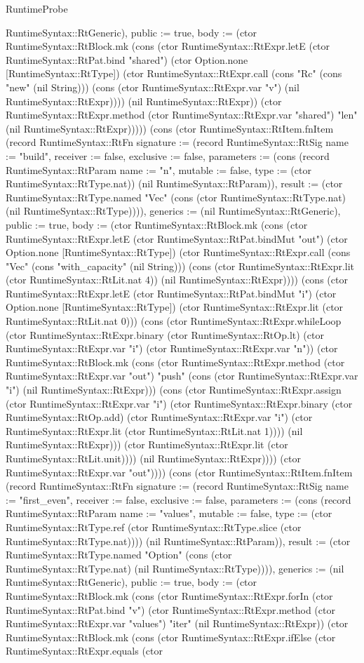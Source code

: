 \begin{lexlean}{RuntimeProbe}
\begin{semanticmodule}
{RuntimeSyntax::RtGeneric), public := true, body := (ctor RuntimeSyntax::RtBlock.mk (cons (ctor RuntimeSyntax::RtExpr.letE (ctor RuntimeSyntax::RtPat.bind "shared") (ctor Option.none [RuntimeSyntax::RtType]) (ctor RuntimeSyntax::RtExpr.call (cons "Rc" (cons "new" (nil String))) (cons (ctor RuntimeSyntax::RtExpr.var "v") (nil RuntimeSyntax::RtExpr)))) (nil RuntimeSyntax::RtExpr)) (ctor RuntimeSyntax::RtExpr.method (ctor RuntimeSyntax::RtExpr.var "shared") "len" (nil RuntimeSyntax::RtExpr)))})) (cons (ctor RuntimeSyntax::RtItem.fnItem (record RuntimeSyntax::RtFn {signature := (record RuntimeSyntax::RtSig {name := "build", receiver := false, exclusive := false, parameters := (cons (record RuntimeSyntax::RtParam {name := "n", mutable := false, type := (ctor RuntimeSyntax::RtType.nat)}) (nil RuntimeSyntax::RtParam)), result := (ctor RuntimeSyntax::RtType.named "Vec" (cons (ctor RuntimeSyntax::RtType.nat) (nil RuntimeSyntax::RtType)))}), generics := (nil RuntimeSyntax::RtGeneric), public := true, body := (ctor RuntimeSyntax::RtBlock.mk (cons (ctor RuntimeSyntax::RtExpr.letE (ctor RuntimeSyntax::RtPat.bindMut "out") (ctor Option.none [RuntimeSyntax::RtType]) (ctor RuntimeSyntax::RtExpr.call (cons "Vec" (cons "with_capacity" (nil String))) (cons (ctor RuntimeSyntax::RtExpr.lit (ctor RuntimeSyntax::RtLit.nat 4)) (nil RuntimeSyntax::RtExpr)))) (cons (ctor RuntimeSyntax::RtExpr.letE (ctor RuntimeSyntax::RtPat.bindMut "i") (ctor Option.none [RuntimeSyntax::RtType]) (ctor RuntimeSyntax::RtExpr.lit (ctor RuntimeSyntax::RtLit.nat 0))) (cons (ctor RuntimeSyntax::RtExpr.whileLoop (ctor RuntimeSyntax::RtExpr.binary (ctor RuntimeSyntax::RtOp.lt) (ctor RuntimeSyntax::RtExpr.var "i") (ctor RuntimeSyntax::RtExpr.var "n")) (ctor RuntimeSyntax::RtBlock.mk (cons (ctor RuntimeSyntax::RtExpr.method (ctor RuntimeSyntax::RtExpr.var "out") "push" (cons (ctor RuntimeSyntax::RtExpr.var "i") (nil RuntimeSyntax::RtExpr))) (cons (ctor RuntimeSyntax::RtExpr.assign (ctor RuntimeSyntax::RtExpr.var "i") (ctor RuntimeSyntax::RtExpr.binary (ctor RuntimeSyntax::RtOp.add) (ctor RuntimeSyntax::RtExpr.var "i") (ctor RuntimeSyntax::RtExpr.lit (ctor RuntimeSyntax::RtLit.nat 1)))) (nil RuntimeSyntax::RtExpr))) (ctor RuntimeSyntax::RtExpr.lit (ctor RuntimeSyntax::RtLit.unit)))) (nil RuntimeSyntax::RtExpr)))) (ctor RuntimeSyntax::RtExpr.var "out"))})) (cons (ctor RuntimeSyntax::RtItem.fnItem (record RuntimeSyntax::RtFn {signature := (record RuntimeSyntax::RtSig {name := "first_even", receiver := false, exclusive := false, parameters := (cons (record RuntimeSyntax::RtParam {name := "values", mutable := false, type := (ctor RuntimeSyntax::RtType.ref (ctor RuntimeSyntax::RtType.slice (ctor RuntimeSyntax::RtType.nat)))}) (nil RuntimeSyntax::RtParam)), result := (ctor RuntimeSyntax::RtType.named "Option" (cons (ctor RuntimeSyntax::RtType.nat) (nil RuntimeSyntax::RtType)))}), generics := (nil RuntimeSyntax::RtGeneric), public := true, body := (ctor RuntimeSyntax::RtBlock.mk (cons (ctor RuntimeSyntax::RtExpr.forIn (ctor RuntimeSyntax::RtPat.bind "v") (ctor RuntimeSyntax::RtExpr.method (ctor RuntimeSyntax::RtExpr.var "values") "iter" (nil RuntimeSyntax::RtExpr)) (ctor RuntimeSyntax::RtBlock.mk (cons (ctor RuntimeSyntax::RtExpr.ifElse (ctor RuntimeSyntax::RtExpr.equals (ctor }
\end{semanticmodule}
\end{lexlean}
